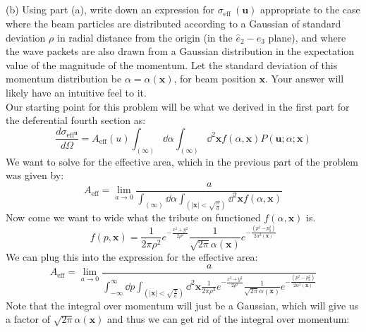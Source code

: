 \documentclass[12pt]{article}
\begin{document}
\subsection{}

(b) Using part (a), write down an expression for $\sigma_{\text {eff }}(\mathbf{u})$ appropriate to the case where the beam particles are distributed according to a Gaussian of standard deviation $\rho$ in radial distance from the origin (in the $\hat{e}_{2}-\hat{e}_{3}$ plane), and where the wave packets are also drawn from a Gaussian distribution in the expectation value of the magnitude of the momentum. Let the standard deviation of this momentum distribution be $\alpha=\alpha(\mathbf{x})$, for beam position $\mathbf{x}$. Your answer will likely have an intuitive feel to it.\\
Our starting point for this problem will be what we derived in the first part for the deferential fourth section as:
\begin{equation}
\frac{d\sigma_{\text{eff}^{\textbf{u}}}}{d\Omega} = A_{\text{eff}}(u) \int_{(\infty)} \dd{\alpha} \int_{(\infty)} \dd^2{\textbf{x}} f(\alpha, \textbf{x}) P(\textbf{u} ; \alpha ; \mathbf{x})
\end{equation}
We want to solve for the effective area, which in the previous part of the problem was given by:
\begin{equation}
A_{\text{eff}} = \lim_{a \to 0} \frac{a}{\int_{(\infty)} \dd{\alpha} \int_{(|\textbf{x}| < \sqrt{\frac{\pi}{a}})} \dd^2{\textbf{x}} f(\alpha, \textbf{x})}
\end{equation}
Now come we want to wide what the tribute on functioned $f(\alpha, \textbf{x})$ is.
\begin{equation}
f(p, \textbf{x}) = \frac{1}{{2\pi \rho^2}} e^{-\frac{x^2 + y^2}{2\rho^2}} \frac{1}{\sqrt{2\pi } \alpha(\textbf{x})} e^{-\frac{(p^2 - p_0^2)}{2\alpha^2(\textbf{x})}}
\end{equation}
We can plug this into the expression for the effective area:
\begin{equation}
A_{\text{eff}} = \lim_{a \to 0} \frac{a}{\int_{-\infty}^{\infty} \dd{p} \int_{(|\textbf{x}| < \sqrt{\frac{\pi}{a}})} \dd^2{\textbf{x}} \frac{1}{{2\pi \rho^2}} e^{-\frac{x^2 + y^2}{2\rho^2}} \frac{1}{\sqrt{2\pi } \alpha(\textbf{x})} e^{-\frac{(p^2 - p_0^2)}{2\alpha^2(\textbf{x})}}}
\end{equation}
Note that the integral over momentum will just be a Gaussian, which will give us a factor of $\sqrt{2\pi} \alpha(\textbf{x})$ and thus we can get rid of the integral over momentum:
\end{document}
